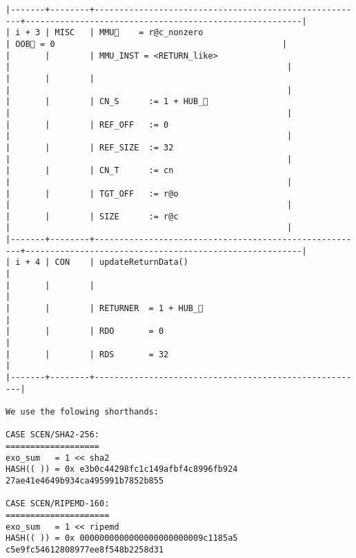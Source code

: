 \documentclass[varwidth=\maxdimen,margin=0.5cm,multi={verbatim}]{standalone}
\begin{document}
\begin{verbatim}
|-------+--------+-------------------------------------------------------+--------------------------------------------------------|
| i + 3 | MISC   | MMU🏴    = r@c_nonzero                                | OOB🏴 = 0                                              |
|       |        | MMU_INST = <RETURN_like>                              |                                                        |
|       |        |                                                       |                                                        |
|       |        | CN_S      := 1 + HUB_                                |                                                        |
|       |        | REF_OFF   := 0                                        |                                                        |
|       |        | REF_SIZE  := 32                                       |                                                        |
|       |        | CN_T      := cn                                       |                                                        |
|       |        | TGT_OFF   := r@o                                      |                                                        |
|       |        | SIZE      := r@c                                      |                                                        |
|-------+--------+-------------------------------------------------------+--------------------------------------------------------|
| i + 4 | CON    | updateReturnData()                                    |
|       |        |                                                       |
|       |        | RETURNER  = 1 + HUB_                                 |
|       |        | RDO       = 0                                         |
|       |        | RDS       = 32                                        |
|-------+--------+-------------------------------------------------------|

We use the folowing shorthands:

CASE SCEN/SHA2-256:  
===================  
exo_sum   = 1 << sha2  
HASH(( )) = 0x e3b0c44298fc1c149afbf4c8996fb924 27ae41e4649b934ca495991b7852b855
                     
CASE SCEN/RIPEMD-160:
=====================
exo_sum   = 1 << ripemd
HASH(( )) = 0x 0000000000000000000000009c1185a5 c5e9fc54612808977ee8f548b2258d31
\end{verbatim}
\end{document}
